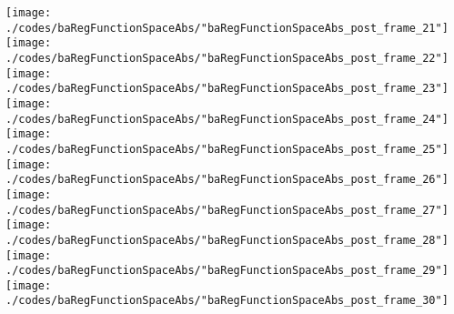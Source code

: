 \begin{frame}{\insertsection}
\begin{center}
{\begin{animateinline}{15}
				 \texttt{[image: ./codes/baRegFunctionSpaceAbs/"baRegFunctionSpaceAbs\_post\_frame\_21"]}\newframe
				 \texttt{[image: ./codes/baRegFunctionSpaceAbs/"baRegFunctionSpaceAbs\_post\_frame\_22"]}\newframe
				 \texttt{[image: ./codes/baRegFunctionSpaceAbs/"baRegFunctionSpaceAbs\_post\_frame\_23"]}\newframe
				 \texttt{[image: ./codes/baRegFunctionSpaceAbs/"baRegFunctionSpaceAbs\_post\_frame\_24"]}\newframe
				 \texttt{[image: ./codes/baRegFunctionSpaceAbs/"baRegFunctionSpaceAbs\_post\_frame\_25"]}\newframe
				 \texttt{[image: ./codes/baRegFunctionSpaceAbs/"baRegFunctionSpaceAbs\_post\_frame\_26"]}\newframe
				 \texttt{[image: ./codes/baRegFunctionSpaceAbs/"baRegFunctionSpaceAbs\_post\_frame\_27"]}\newframe
				 \texttt{[image: ./codes/baRegFunctionSpaceAbs/"baRegFunctionSpaceAbs\_post\_frame\_28"]}\newframe
				 \texttt{[image: ./codes/baRegFunctionSpaceAbs/"baRegFunctionSpaceAbs\_post\_frame\_29"]}\newframe
				 \texttt{[image: ./codes/baRegFunctionSpaceAbs/"baRegFunctionSpaceAbs\_post\_frame\_30"]}
			 \end{animateinline}
			}
	\end{center}
    
\end{frame}


